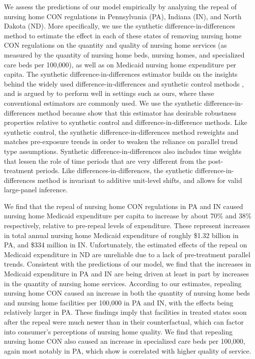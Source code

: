 \documentclass[../Main.tex]{subfiles}
\begin{document}
We assess the predictions of our model empirically by analyzing the repeal of nursing home CON regulations in Pennsylvania (PA), Indiana (IN), and North Dakota (ND). More specifically, we use the synthetic difference-in-differences method \citep{arkhangelsky2021synthetic} to estimate the effect in each of these states of removing nursing home CON regulations on the quantity and quality of nursing home services (as measured by the quantity of nursing home beds, nursing homes, and specialized care beds per 100,000), as well as on Medicaid nursing home expenditure per capita. The synthetic difference-in-differences estimator builds on the insights behind the widely used difference-in-differences and synthetic control methods \citep{abadie2003economic,abadie2010synthetic,currie2020technology}, and is argued by \citet{arkhangelsky2021synthetic} to perform well in settings such as ours, where these conventional estimators are commonly used. We use the synthetic difference-in-differences method because \citet{arkhangelsky2021synthetic} show that this estimator has desirable robustness properties relative to synthetic control and difference-in-difference methods. Like synthetic control, the synthetic difference-in-differences method reweights and matches pre-exposure trends in order to weaken the reliance on parallel trend type assumptions. Synthetic difference-in-differences also includes time weights that lessen the role of time periods that are very different from the post-treatment periods. Like differences-in-differences, the synthetic difference-in-differences method is invariant to additive unit-level shifts, and allows for valid large-panel inference.

We find that the repeal of nursing home CON regulations in PA and IN caused nursing home Medicaid expenditure per capita to increase by about 70\% and 38\% respectively, relative to pre-repeal levels of expenditure. These represent increases in total annual nursing home Medicaid expenditure of roughly \$1.32 billion in PA, and \$334 million in IN. Unfortunately, the estimated effects of the repeal on Medicaid expenditure in ND are unreliable due to a lack of pre-treatment parallel trends. Consistent with the predictions of our model, we find that the increases in Medicaid expenditure in PA and IN are being driven at least in part by increases in the quantity of nursing home services. According to our estimates, repealing nursing home CON caused an increase in both the quantity of nursing home beds and nursing home facilities per 100,000 in PA and IN, with the effects being relatively larger in PA. These findings imply that facilities in treated states soon after the repeal were much newer than in their counterfactual, which can factor into consumer's perceptions of nursing home quality. We find that repealing nursing home CON also caused an increase in specialized care beds per 100,000, again most notably in PA, which \citet{grabowski2010quality} show is correlated with higher quality of service. 
\end{document}
